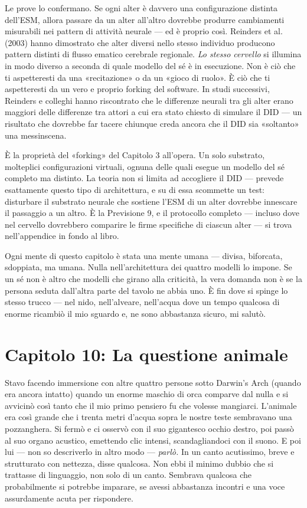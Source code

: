 \documentclass[11pt, twoside, openright]{book}
\begin{document}
Le prove lo confermano. Se ogni alter è davvero una configurazione distinta dell'ESM, allora passare da un alter all'altro dovrebbe produrre cambiamenti misurabili nei pattern di attività neurale --- ed è proprio così. Reinders et al. (2003) hanno dimostrato che alter diversi nello stesso individuo producono pattern distinti di flusso ematico cerebrale regionale. \textit{Lo stesso cervello} si illumina in modo diverso a seconda di quale modello del sé è in esecuzione. Non è ciò che ti aspetteresti da una «recitazione» o da un «gioco di ruolo». È ciò che ti aspetteresti da un vero e proprio forking del software. In studi successivi, Reinders e colleghi hanno riscontrato che le differenze neurali tra gli alter erano maggiori delle differenze tra attori a cui era stato chiesto di simulare il DID --- un risultato che dovrebbe far tacere chiunque creda ancora che il DID sia «soltanto» una messinscena.

È la proprietà del «forking» del Capitolo 3 all'opera. Un solo substrato, molteplici configurazioni virtuali, ognuna delle quali esegue un modello del sé completo ma distinto. La teoria non si limita ad accogliere il DID --- prevede esattamente questo tipo di architettura, e su di essa scommette un test: disturbare il substrato neurale che sostiene l'ESM di un alter dovrebbe innescare il passaggio a un altro. È la Previsione 9, e il protocollo completo --- incluso dove nel cervello dovrebbero comparire le firme specifiche di ciascun alter --- si trova nell'appendice in fondo al libro.

Ogni mente di questo capitolo è stata una mente umana --- divisa, biforcata, sdoppiata, ma umana. Nulla nell'architettura dei quattro modelli lo impone. Se un sé non è altro che modelli che girano alla criticità, la vera domanda non è se la persona seduta dall'altra parte del tavolo ne abbia uno. È fin dove si spinge lo stesso trucco --- nel nido, nell'alveare, nell'acqua dove un tempo qualcosa di enorme ricambiò il mio sguardo e, ne sono abbastanza sicuro, mi salutò.


\chapter*{Capitolo 10: La questione animale}

Stavo facendo immersione con altre quattro persone sotto Darwin's Arch (quando era ancora intatto) quando un enorme maschio di orca comparve dal nulla e si avvicinò così tanto che il mio primo pensiero fu che volesse mangiarci. L'animale era così grande che i trenta metri d'acqua sopra le nostre teste sembravano una pozzanghera. Si fermò e ci osservò con il suo gigantesco occhio destro, poi passò al suo organo acustico, emettendo clic intensi, scandagliandoci con il suono. E poi lui --- non so descriverlo in altro modo --- \textit{parlò.} In un canto acutissimo, breve e strutturato con nettezza, disse qualcosa. Non ebbi il minimo dubbio che si trattasse di linguaggio, non solo di un canto. Sembrava qualcosa che probabilmente si potrebbe imparare, se avessi abbastanza incontri e una voce assurdamente acuta per rispondere.
\end{document}
